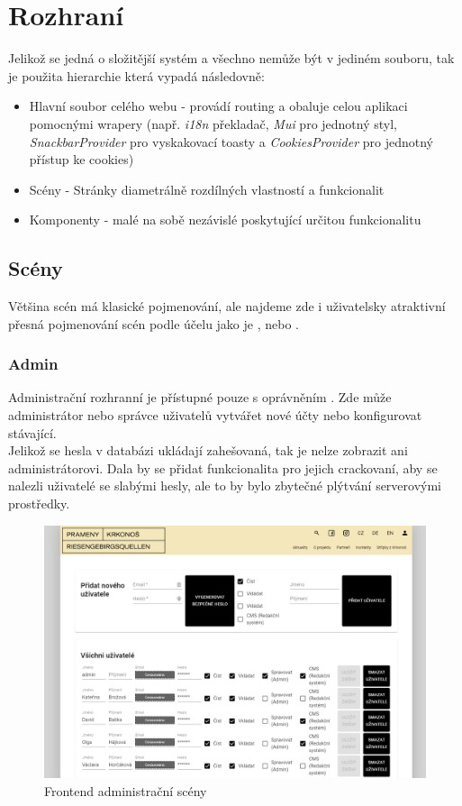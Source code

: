 \section{Rozhraní}
Jelikož se jedná o složitější systém a všechno nemůže být  v jediném souboru, tak 
je použita hierarchie která vypadá následovně:
\begin{itemize}
	\item Hlavní soubor celého webu - provádí routing a obaluje celou aplikaci pomocnými wrapery
		(např. \textit{i18n} překladač, \textit{Mui} pro jednotný styl, \textit{SnackbarProvider}
		pro vyskakovací toasty a \textit{CookiesProvider} pro jednotný přístup ke cookies)
	\item Scény - Stránky diametrálně rozdílných vlastností a funkcionalit
	\item Komponenty - malé na sobě nezávislé  poskytující určitou funkcionalitu
\end{itemize}


\subsection{Scény}
Většina scén má klasické pojmenování, ale najdeme zde i uživatelsky atraktivní přesná
pojmenování scén podle účelu jako je ,  nebo .

\subsubsection{Admin}
Administrační rozhranní je přístupné pouze s oprávněním .
Zde může administrátor nebo správce uživatelů vytvářet nové účty nebo
konfigurovat stávající.\\
Jelikož se hesla v databázi ukládají zahešovaná, tak je nelze zobrazit ani administrátorovi.
Dala by se přidat funkcionalita pro jejich crackovaní, aby se nalezli uživatelé se
slabými hesly, ale to by bylo zbytečné plýtvání serverovými prostředky.
\begin{figure}[H]
	\centering
	\includegraphics[width=.8\linewidth]{img/adminScene.png}
	\caption{Frontend administrační scény}
\end{figure}

